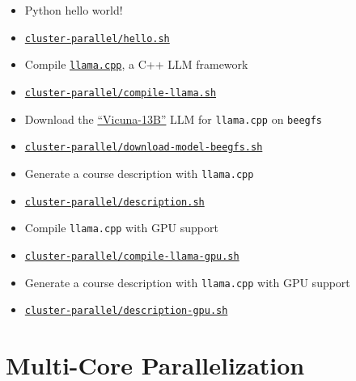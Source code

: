 \documentclass[12pt,aspectratio=169,xcolor=dvipsnames,hyperref={colorlinks,urlcolor=iiia_orange}]{beamer}
\begin{document}
\newcommand{\giturl}[1]{\href{https://github.com/filippobistaffa/phd-day-parallelization/blob/main/#1}{\texttt{#1}}}

\begin{frame}{}
    \begin{itemize}
        \setlength\itemsep{-1pt}
        \item[\faGithub] Python hello world!
        \item[] \giturl{cluster-parallel/hello.sh}
        \item[\faGithub] Compile \href{https://github.com/ggerganov/llama.cpp}{\texttt{llama.cpp}}, a C++ LLM framework
        \item[] \giturl{cluster-parallel/compile-llama.sh}
        \item[\faGithub] Download the \href{https://lmsys.org/blog/2023-03-30-vicuna}{``Vicuna-13B''} LLM for \texttt{llama.cpp} on \texttt{beegfs}
        \item[] \giturl{cluster-parallel/download-model-beegfs.sh}
        \item[\faGithub] Generate a course description with \texttt{llama.cpp}
        \item[] \giturl{cluster-parallel/description.sh}
        \item[\faGithub] Compile \texttt{llama.cpp} with GPU support
        \item[] \giturl{cluster-parallel/compile-llama-gpu.sh}
        \item[\faGithub] Generate a course description with \texttt{llama.cpp} with GPU support
        \item[] \giturl{cluster-parallel/description-gpu.sh}
    \end{itemize}
\end{frame}

\section{Multi-Core Parallelization}

\end{document}
